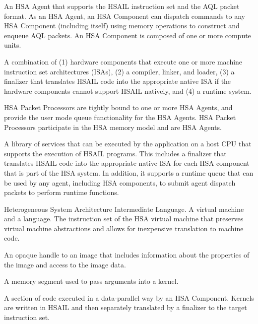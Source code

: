 \documentclass[final,oneside]{book}
\begin{document}
\begin{description}[itemsep=5pt,leftmargin=0cm, labelindent=0cm]
\item[HSA Component] An HSA Agent that supports the HSAIL instruction set and
  the AQL packet format. As an HSA Agent, an HSA Component can dispatch commands
  to any HSA Component (including itself) using memory operations to construct
  and enqueue AQL packets. An HSA Component is composed of one or more compute
  units.

\item[HSA implementation] A combination of (1) hardware components that execute
  one or more machine instruction set architectures (ISAs), (2) a compiler,
  linker, and loader, (3) a finalizer that translates HSAIL code into the
  appropriate native ISA if the hardware components cannot support HSAIL
  natively, and (4) a runtime system.

\item[HSA Packet Processor] HSA Packet Processors are tightly bound to one or
  more HSA Agents, and provide the user mode queue functionality for the HSA
  Agents. HSA Packet Processors participate in the HSA memory model and are HSA
  Agents.

\item[HSA runtime] A library of services that can be executed by the application
  on a host CPU that supports the execution of HSAIL programs. This includes a
  finalizer that translates HSAIL code into the appropriate native ISA for each
  HSA component that is part of the HSA system. In addition, it supports a
  runtime queue that can be used by any agent, including HSA components, to
  submit agent dispatch packets to perform runtime functions.

\item[HSAIL] Heterogeneous System Architecture Intermediate Language. A virtual
  machine and a language. The instruction set of the HSA virtual machine that
  preserves virtual machine abstractions and allows for inexpensive translation
  to machine code.

\item[Image handle] An opaque handle to an image that includes information about
  the properties of the image and access to the image data.

\item[Kernarg segment] A memory segment used to pass arguments into a kernel.

\item[Kernel] A section of code executed in a data-parallel way by an HSA
  Component. Kernels are written in HSAIL and then separately translated by a
  finalizer to the target instruction set.


\end{description}
\end{document}

